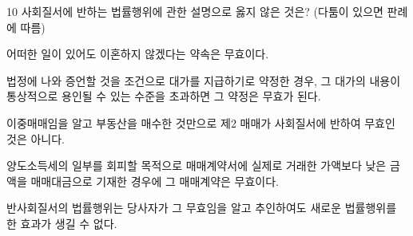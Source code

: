 \begin{question}{10}
사회질서에 반하는 법률행위에 관한 설명으로 옳지 않은 것은? (다툼이 있으면 판례에 따름)
\begin{choices}
  \item 어떠한 일이 있어도 이혼하지 않겠다는 약속은 무효이다.
  \item 법정에 나와 증언할 것을 조건으로 대가를 지급하기로 약정한 경우, 그 대가의 내용이 통상적으로 용인될 수 있는 수준을 초과하면 그 약정은 무효가 된다.
  \item 이중매매임을 알고 부동산을 매수한 것만으로 제2 매매가 사회질서에 반하여 무효인 것은 아니다.
  \item 양도소득세의 일부를 회피할 목적으로 매매계약서에 실제로 거래한 가액보다 낮은 금액을 매매대금으로 기재한 경우에 그 매매계약은 무효이다.
  \item 반사회질서의 법률행위는 당사자가 그 무효임을 알고 추인하여도 새로운 법률행위를 한 효과가 생길 수 없다.
\end{choices}
\end{question}
